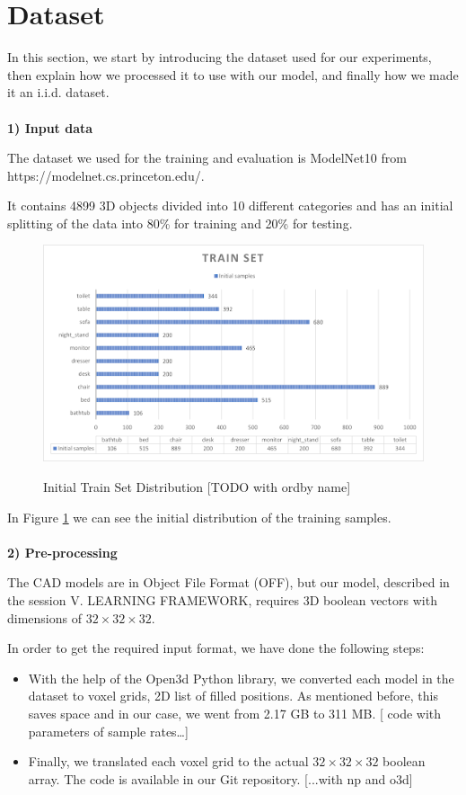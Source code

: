 \section{Dataset}
\label{sec:dataset}
In this section, we start by introducing the dataset used for our experiments, then explain how we processed it to use with our model, and finally how we made it an i.i.d. dataset.\\\\
\textbf{1) Input data} 

The dataset we used for the training and evaluation is ModelNet10 from https://modelnet.cs.princeton.edu/. 

It contains 4899 3D objects divided into 10 different categories and has an initial splitting of the data into 80\% for training and 20\% for testing.\\
\begin{figure}[]
	\centering
	\caption{Initial Train Set Distribution [TODO with ordby name]}
	\includegraphics[scale = 0.45]{resources/distribution.png}
	\label{fig:initialTrainSetDistribution}
\end{figure}
In Figure \ref{fig:initialTrainSetDistribution} we can see the initial distribution of the training samples.
\   \\\\
\textbf{2) Pre-processing} 

The CAD models are in Object File Format (OFF), but our model, described in the session V. LEARNING FRAMEWORK, requires 3D boolean vectors with dimensions of \mbox{$32\times32\times32$}.

In order to get the required input format, we have done the following steps:
\begin{itemize}
	\item With the help of the Open3d Python library, we converted each model in the dataset to voxel grids, 2D list of filled positions. As mentioned before, this saves space and in our case, we went from 2.17 GB to 311 MB. [ code with parameters of sample rates…]
	\item Finally, we translated each voxel grid to the actual \mbox{$32\times32\times32$} boolean array. The code is available in our Git repository. [...with np and o3d]
\end{itemize}

